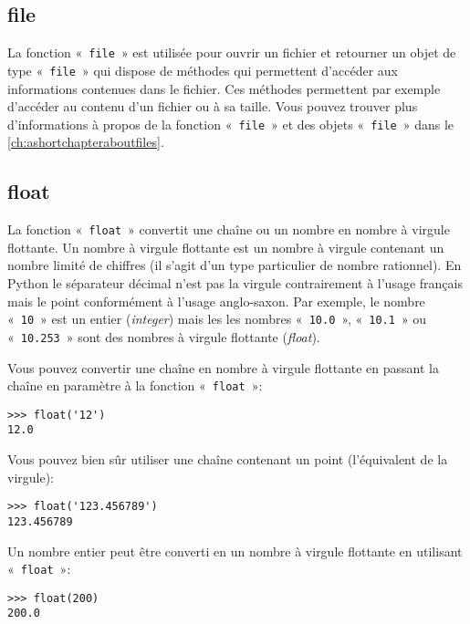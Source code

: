 \subsection*{file}

La fonction « \texttt{file} » est utilisée pour ouvrir un fichier et retourner un objet de type « \texttt{file} » qui dispose de méthodes qui permettent d'accéder aux informations contenues dans le fichier. Ces méthodes permettent par exemple d'accéder au contenu d'un fichier ou à sa taille. Vous pouvez trouver plus d'informations à propos de la fonction « \texttt{file} » et des objets « \texttt{file} » dans le \autoref{ch:ashortchapteraboutfiles}.

\subsection*{float}

La fonction « \texttt{float} » convertit une chaîne ou un nombre en nombre à virgule flottante. Un nombre à virgule flottante est un nombre à virgule contenant un nombre limité de chiffres (il s'agit d'un type particulier de nombre rationnel). En Python le séparateur décimal n'est pas la virgule contrairement à l'usage français mais le point conformément à l'usage anglo-saxon. Par exemple, le nombre « \texttt{10} » est un entier (\emph{integer}) mais les les nombres « \texttt{10.0} », « \texttt{10.1} » ou « \texttt{10.253} » sont des nombres à virgule flottante (\emph{float}).

Vous pouvez convertir une chaîne en nombre à virgule flottante en passant la chaîne en paramètre à la fonction « \texttt{float} »: 
\begin{Verbatim}[frame=single,rulecolor=\color{gray}]
>>> float('12')
12.0
\end{Verbatim}

Vous pouvez bien sûr utiliser une chaîne contenant un point (l'équivalent de la virgule):

\begin{Verbatim}[frame=single,rulecolor=\color{gray}]
>>> float('123.456789')
123.456789
\end{Verbatim}

Un nombre entier peut être converti en un nombre à virgule flottante en utilisant « \texttt{float} »: 
\begin{Verbatim}[frame=single,rulecolor=\color{gray}]
>>> float(200)
200.0
\end{Verbatim}

